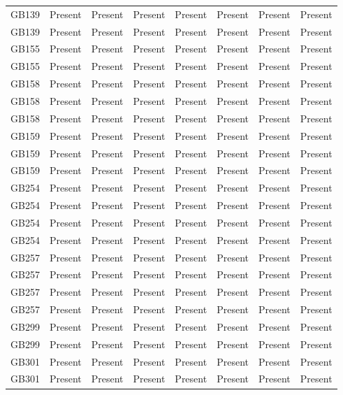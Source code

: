 \begin{longtable}{p{1.5cm}p{2.5cm}p{2.5cm}p{2.5cm}p{2.5cm}p{2.5cm}p{2.5cm}p{2.5cm}}
  GB139 & Present & Present & Present & Present & Present & Present & Present \\ 
  GB139 & Present & Present & Present & Present & Present & Present & Present \\ 
  GB155 & Present & Present & Present & Present & Present & Present & Present \\ 
  GB155 & Present & Present & Present & Present & Present & Present & Present \\ 
  GB158 & Present & Present & Present & Present & Present & Present & Present \\ 
  GB158 & Present & Present & Present & Present & Present & Present & Present \\ 
  GB158 & Present & Present & Present & Present & Present & Present & Present \\ 
  GB159 & Present & Present & Present & Present & Present & Present & Present \\ 
  GB159 & Present & Present & Present & Present & Present & Present & Present \\ 
  GB159 & Present & Present & Present & Present & Present & Present & Present \\ 
  GB254 & Present & Present & Present & Present & Present & Present & Present \\ 
  GB254 & Present & Present & Present & Present & Present & Present & Present \\ 
  GB254 & Present & Present & Present & Present & Present & Present & Present \\ 
  GB254 & Present & Present & Present & Present & Present & Present & Present \\ 
  GB257 & Present & Present & Present & Present & Present & Present & Present \\ 
  GB257 & Present & Present & Present & Present & Present & Present & Present \\ 
  GB257 & Present & Present & Present & Present & Present & Present & Present \\ 
  GB257 & Present & Present & Present & Present & Present & Present & Present \\ 
  GB299 & Present & Present & Present & Present & Present & Present & Present \\ 
  GB299 & Present & Present & Present & Present & Present & Present & Present \\ 
  GB301 & Present & Present & Present & Present & Present & Present & Present \\ 
  GB301 & Present & Present & Present & Present & Present & Present & Present \\ 

\end{longtable}
